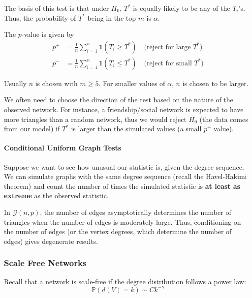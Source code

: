 \documentclass{article}
\begin{document}
The basis of this test is that under $H_0$, $T^*$ is equally likely to be any of the $T_i$'s. Thus, the probability of $T^*$ being in the top $m$ is $\alpha$. 

The $p$-value is given by 
\begin{align*}
    p^+ &= \frac{1}{n}\sum_{i=1}^{n}\mathbf{1}(T_i\geq T^*) \quad \text{(reject for large $T^*$)}\\
    p^- &= \frac{1}{n}\sum_{i=1}^{n}\mathbf{1}(T_i\leq T^*) \quad \text{(reject for small $T^*$)}
\end{align*}


\begin{remark}
    Usually $n$ is chosen with $m\geq 5$. For smaller values of $\alpha$, $n$ is chosen to be larger.  
\end{remark}

\begin{remark}
    We often need to choose the direction of the test based on the nature of the observed network. For instance, a friendship/social network is expected to have more triangles than a random network, thus we would reject $H_0$ (the data comes from our model) if $T^*$ is larger than the simulated values (a small $p^+$ value).
\end{remark}

\paragraph{Conditional Uniform Graph Tests} Suppose we want to see how unusual our statistic is, given the degree sequence. We can simulate graphs with the same degree sequence (recall the Havel-Hakimi theorem) and count the number of times the simulated statistic is \textbf{at least as extreme} as the observed statistic.

\begin{remark}
    In $\mathcal{G}(n,p)$, the number of edges asymptotically determines
the number of triangles when the number of edges is moderately large. Thus,
conditioning on the number of edges (or the vertex degrees, which determine
the number of edges) gives degenerate results.
\end{remark}

\subsubsection{Scale Free Networks}
Recall that a network is scale-free if the degree distribution follows a power law:
\begin{equation*}
    \mathbb{P}(d(V)=k)\sim C k^{-\gamma}
\end{equation*}
\end{document}
